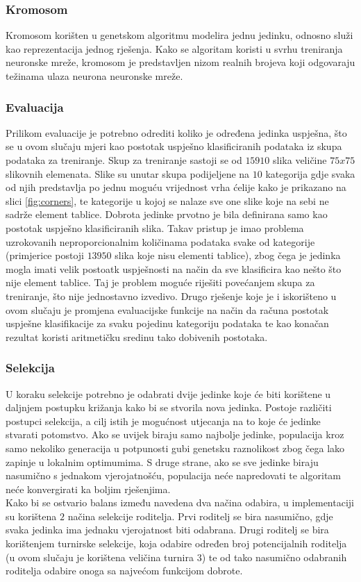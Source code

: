 \documentclass[times, utf8, zavrsni, numeric]{fer}
\begin{document}
\subsubsection{Kromosom}
Kromosom korišten u genetskom algoritmu modelira jednu jedinku, odnosno služi kao reprezentacija jednog rješenja.
Kako se algoritam koristi u svrhu treniranja neuronske mreže, kromosom je predstavljen nizom realnih brojeva koji odgovaraju težinama ulaza neurona neuronske mreže.

\subsubsection{Evaluacija}
Prilikom evaluacije je potrebno odrediti koliko je određena jedinka uspješna, što se u ovom slučaju mjeri kao postotak uspješno klasificiranih podataka iz skupa podataka za treniranje.
Skup za treniranje sastoji se od $15910$ slika veličine $75x75$ slikovnih elemenata.
Slike su unutar skupa podijeljene na $10$ kategorija gdje svaka od njih predstavlja po jednu moguću vrijednost vrha ćelije kako je prikazano na slici \ref{fig:corners}, te kategorije u kojoj se nalaze sve one slike koje na sebi ne sadrže element tablice.
Dobrota jedinke prvotno je bila definirana samo kao postotak uspješno klasificiranih slika.
Takav pristup je imao problema uzrokovanih neproporcionalnim količinama podataka svake od kategorije (primjerice postoji $13950$ slika koje nisu elementi tablice), zbog čega je jedinka mogla imati velik postoatk uspješnosti na način da sve klasificira kao nešto što nije element tablice.
Taj je problem moguće riješiti povećanjem skupa za treniranje, što nije jednostavno izvedivo.
Drugo rješenje koje je i iskorišteno u ovom slučaju je promjena evaluacijske funkcije na način da računa postotak uspješne klasifikacije za svaku pojedinu kategoriju podataka te kao konačan rezultat koristi aritmetičku sredinu tako dobivenih postotaka.
 
\subsubsection{Selekcija}
U koraku selekcije potrebno je odabrati dvije jedinke koje će biti korištene u daljnjem postupku križanja kako bi se stvorila nova jedinka.
Postoje različiti postupci selekcija, a cilj istih je mogućnost utjecanja na to koje će jedinke stvarati potomstvo. 
Ako se uvijek biraju samo najbolje jedinke, populacija kroz samo nekoliko generacija u potpunosti gubi genetsku raznolikost zbog čega lako zapinje u lokalnim optimumima.
S druge strane, ako se sve jedinke biraju nasumično s jednakom vjerojatnošću, populacija neće napredovati te algoritam neće konvergirati ka boljim rješenjima.\\
Kako bi se ostvario balans između navedena dva načina odabira, u implementaciji su korištena $2$ načina selekcije roditelja.
Prvi roditelj se bira nasumično, gdje svaka jedinka ima jednaku vjerojatnost biti odabrana.
Drugi roditelj se bira korištenjem turnirske selekcije, koja odabire određen broj potencijalnih roditelja (u ovom slučaju je korištena veličina turnira $3$) te od tako nasumično odabranih roditelja odabire onoga sa najvećom funkcijom dobrote.
\end{document}
